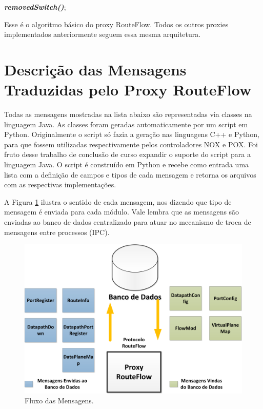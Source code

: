 \noindent
{}
\newline
\textit{\textbf{removedSwitch()}};
\newline


Esse é o algoritmo básico do proxy RouteFlow. Todos os outros 
proxies implementados anteriormente seguem essa mesma
arquitetura.
\section{Descrição das Mensagens Traduzidas pelo Proxy RouteFlow}

Todas as mensagens mostradas na lista abaixo são representadas
via classes na linguagem Java. As classes foram geradas
automaticamente por um script em Python. Originalmente
o script só fazia a geração nas linguagens C++ e Python,
para que fossem utilizadas respectivamente pelos controladores
NOX e POX. Foi fruto desse trabalho de conclusão de curso
expandir o suporte do script para a linguagem Java. O script
é construído em Python e recebe como entrada uma lista com
a definição de campos e tipos de cada mensagem e retorna
os arquivos com as respectivas implementações. 

A Figura \ref{fig:mensagens}
ilustra o sentido de cada mensagem, nos dizendo que tipo de mensagem
é enviada para cada módulo. Vale lembra que as mensagens
são enviadas ao banco de dados centralizado para atuar no
mecanismo de troca de mensagens entre processos (IPC).
\newline

\begin{figure}[h] 
\centering
\includegraphics[width=140mm]{mensagens.png}
\caption{Fluxo das Mensagens.}
\label{fig:mensagens} 
\end{figure}

